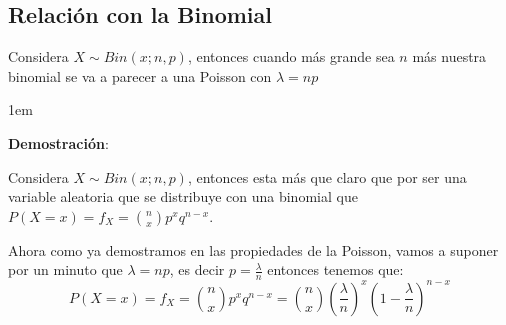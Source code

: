 \documentclass[12pt, fleqn]{report}                             %
\newenvironment{SmallIndentation}[1][0.75em]                    %
        {\begin{adjustwidth}{#1}{}\begin{footnotesize}}             %
        {\end{footnotesize}\end{adjustwidth}}                       %
\theoremstyle{break}                                            %
\newcommand{\Wrap}[1]{\left( #1 \right)}                        %
\begin{document}
            \clearpage
            \subsection{Relación con la Binomial}

                Considera $X \sim Bin(x; n, p)$, entonces cuando más grande sea $n$ más nuestra binomial se 
                va a parecer a una Poisson con $\lambda = np$

                \begin{SmallIndentation}[1em]
                    \textbf{Demostración}:
                    
                    Considera $X \sim Bin(x; n, p)$, entonces esta más que claro que por
                    ser una variable aleatoria que se distribuye con una binomial
                    que $P(X = x) = f_X = {n \choose x}p^x q^{n - x}$.

                    Ahora como ya demostramos en las propiedades de la Poisson, vamos a suponer
                    por un minuto que $\lambda = np$, es decir $p = \frac{\lambda}{n}$ entonces tenemos que:
                    \begin{equation*}
                        P(X = x) 
                            = f_X 
                            = {n \choose x}p^x q^{n - x}
                            = {n \choose x}\Wrap{\frac{\lambda}{n}}^x \Wrap{1 - \frac{\lambda}{n}}^{n - x}
                    \end{equation*}


\end{SmallIndentation}
\end{document}
